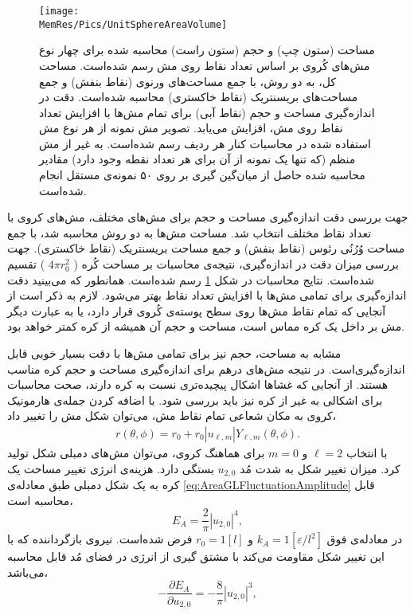 \begin{figure}[tbp]
\begin{center}
\texttt{[image: \\MemRes/Pics/UnitSphereAreaVolume]}
\caption{
مساحت (ستون چپ) و حجم (ستون راست) محاسبه‌ شده برای چهار نوع مش‌های کُروی بر اساس تعداد نقاط روی مش رسم شده‌است. مساحت کل، به دو روش، با جمع مساحت‌های ورنوی (نقاط بنفش) و جمع مساحت‌های بریسنتریک (نقاط خاکستری) محاسبه شده‌است. دقت در اندازه‌گیری مساحت و حجم (نقاط آبی) برای تمام مش‌ها با افزایش تعداد نقاط روی مش، افزایش می‌یابد. تصویر مش نمونه از هر نوع مش استفاده شده در محاسبات کنار هر ردیف رسم شده‌است. به غیر از مش منظم (که تنها یک نمونه از آن برای هر تعداد نقطه وجود دارد) مقادیر محاسبه شده حاصل از میان‌گین گیری بر روی ۵۰ نمونه‌ی مستقل انجام شده‌است.
}
\label{fig:unitsphereAreaVolume}
\end{center}
\end{figure}

جهت بررسی دقت اندازه‌گیری مساحت و حجم برای مش‌های مختلف، مش‌های کروی با تعداد نقاط مختلف انتخاب شد.  مساحت مش‌ها به دو روش محاسبه شد، با جمع  مساحت‌ وُرُنُی رئوس (نقاط بنفش) و جمع مساحت بریسنتریک (نقاط خاکستری). جهت بررسی میزان دقت در اندازه‌گیری،  نتیجه‌ی محاسبات بر مساحت کُره (
$4\pi r_0^2$
)  تقسیم شده‌است. نتایج محاسبات در شکل
\ref{fig:unitsphereAreaVolume}
رسم شده‌است. همانطور که می‌بینید دقت اندازه‌گیری برای تمامی مش‌ها با افزایش تعداد نقاط بهتر می‌شود. لازم به ذکر است  از آنجایی که تمام نقاط مش‌ها روی سطح پوسته‌ی کُروی قرار دارد، یا به عبارت دیگر مش بر داخل یک کره‌ مماس است، مساحت و حجم آن همیشه از کره کمتر خواهد بود.




مشابه به مساحت، حجم نیز برای تمامی مش‌ها با دقت بسیار خوبی قابل اندازه‌گیری‌است. در نتیجه مش‌های درهم برای اندازه‌گیری مساحت و حجم کره مناسب هستند. از آنجایی که غشا‌ها اشکال پیچیده‌تری نسبت به کره دارند، صحت محاسبات برای اشکالی به غیر از کره نیز باید بررسی شود. با اضافه کردن جمله‌ی هارمونیک کروی به مکان شعاعی تمام نقاط مش، می‌توان شکل مش را تغییر داد،
\begin{eqnarray}
r(\theta,\phi)=r_0+r_0|u_{\ell,m}|Y_{\ell,m}(\theta,\phi).
\label{eq:rDeformed}
\end{eqnarray}
با انتخاب
$\ell=2$
و
$m=0$
برای هماهنگ‌ کروی، می‌توان مش‌های دمبلی شکل  تولید کرد. میزان تغییر شکل به شدت مُد
$u_{2,0}$
بستگی دارد. هزینه‌ی انرژی تغییر مساحت یک کره به یک شکل دمبلی طبق معادله‌ی
\ref{eq:AreaGLFluctuationAmplitude}
قابل محاسبه ‌است،
\begin{equation}
E_A=\frac{2}{\pi}|u_{2,0}|^4,
\label{eq:AreaEnergyULM20}
\end{equation}
در معادله‌ی فوق 
$k_A=1[\varepsilon/l^2]$
و
$r_0=1[l]$
فرض شده‌است. نیروی بازگرداننده که با این تغییر شکل مقاومت می‌کند با مشتق گیری از انرژی در فضای مُد قابل محاسبه‌ می‌باشد، 
\begin{equation}
-\frac{\partial E_A}{\partial u_{2,0}}=-\frac{8}{\pi}|u_{2,0}|^3,
\label{eq:AreaForceULM20}
\end{equation}


